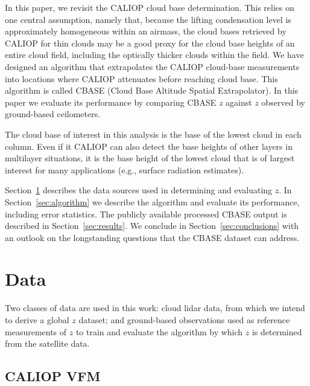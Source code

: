 \documentclass[essd,manuscript]{copernicus}\usepackage[]{graphicx}\usepackage[]{color}
\newcommand\CBH{\ensuremath{z}}
\begin{document}
In this paper, we revisit the CALIOP cloud base determination.  This relies on
one central assumption, namely that, because the
lifting condensation level is approximately homogeneous within an airmass, the
cloud bases retrieved by CALIOP for thin clouds may be a good proxy for the cloud
base heights of an entire cloud field, including the optically thicker clouds
within the field.  
We have designed an algorithm that extrapolates the CALIOP
cloud-base measurements into locations where CALIOP attenuates before reaching
cloud base.  This algorithm is called CBASE (Cloud Base Altitude Spatial
Extrapolator).  In this paper we evaluate its performance by comparing CBASE
\CBH{} against \CBH{} observed by ground-based
ceilometers.

The cloud base of interest in this analysis is the base of the lowest cloud in
each column. Even if it CALIOP can also detect the base heights of other layers
in multilayer situations, it is the base height of the lowest cloud that is of
largest interest for many applications (e.g., surface radiation
estimates). 

Section~\ref{sec:data} describes the data sources used in determining and
evaluating \CBH{}.  In Section~\ref{sec:algorithm} we describe
the algorithm and evaluate its performance, including error statistics.  The
publicly available processed CBASE output is described in
Section~\ref{sec:results}.  We conclude in Section~\ref{sec:conclusions} with an
outlook on the longstanding questions that the CBASE dataset can address.

\section{Data}
\label{sec:data}

Two classes of data are used in this work: cloud lidar data, from which we
intend to derive a global \CBH{} dataset; and ground-based observations used as
reference measurements of \CBH{} to train and evaluate the algorithm by which
\CBH{} is determined from the satellite data.

\subsection{CALIOP VFM}
\end{document}
